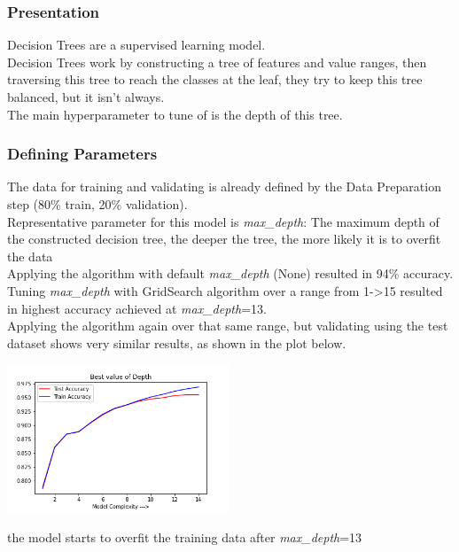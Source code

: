 \subsubsection{Presentation}
Decision Trees are a supervised learning model.\\
Decision Trees work by constructing a tree of features and value ranges, then traversing this tree to reach the classes at the leaf, they try to keep this tree balanced, but it isn't always.\\
The main hyperparameter to tune of is the depth of this tree.
\subsubsection{Defining Parameters}
The data for training and validating is already defined by the Data Preparation step (80\% train, 20\% validation).\\
Representative parameter for this model is \emph{max_depth}: The maximum depth of the constructed decision tree, the deeper the tree, the more likely it is to overfit the data\\

Applying the algorithm with default \emph{max_depth} (None) resulted in 94\% accuracy.\\
Tuning \emph{max_depth} with GridSearch algorithm over a range from 1->15 resulted in highest accuracy achieved at \emph{max_depth}=13.\\
Applying the algorithm again over that same range, but validating using the test dataset shows very similar results, as shown in the plot below.\\

\begin{center}
    \captionsetup{type=figure}
    \includegraphics[width=250px]{DT_complexity.png}
\end{center}

the model starts to overfit the training data after \emph{max_depth}=13\\

